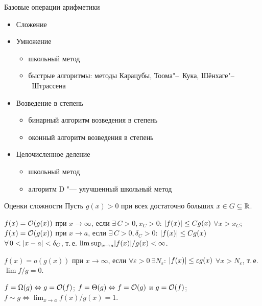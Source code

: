 \documentclass{ca-slides}
\author{}
\begin{document}
\titleframe

\begin{canvasframe}{Базовые операции арифметики}
  \begin{itemize}
    \item Сложение
    \item Умножение
    \begin{itemize}
      \item школьный метод
      \item быстрые алгоритмы: методы Карацубы, Тоома"--~Кука, Шёнхаге"--~Штрассена
    \end{itemize}
    \item Возведение в степень
    \begin{itemize}
      \item бинарный алгоритм возведения в степень
      \item оконный алгоритм возведения в степень
    \end{itemize}
    \item Целочисленное деление
    \begin{itemize}
      \item школьный метод
      \item алгоритм D "--- улучшенный школьный метод
    \end{itemize}
  \end{itemize}
\end{canvasframe}

\begin{canvasframe}[shrink=18]{Оценки сложности}
  \small
  Пусть $g(x) > 0$ при всех достаточно больших $x \in G \subseteq \mathbb{R}$.
  \begin{definition}[$\bigO$]
    $f(x) = \mathcal{O}(g(x))$ при $x \to \infty$, если $\exists\, C > 0, x_C > 0$:
    $\lvert f(x)\rvert \le C g(x)$ $\forall x > x_C$;\\
    $f(x) = \mathcal{O}(g(x))$ при $x \to a$, если $\exists\, C > 0, \delta_C > 0$:
    $\lvert f(x)\rvert \le C g(x)$ $\forall\, 0 < \lvert x - a\rvert < \delta_C$,
    т.\,е. $\limsup_{x \to a} \lvert f(x)\rvert/g(x) < \infty$.
  \end{definition}
  \begin{definition}[$o$]
    $f(x) = o(g(x))$ при $x \to \infty$, если $\forall \varepsilon > 0\ \exists N_\varepsilon$:
    $\lvert f(x)\rvert \le \varepsilon g(x)$ $\forall x > N_\varepsilon$, т.\,е. $\lim f/g = 0$.
  \end{definition}
  \begin{definition}
    $f = \Omega(g) \Leftrightarrow g = \mathcal{O}(f)$;\quad
    $f = \Theta(g) \Leftrightarrow f = \mathcal{O}(g)$ и $g = \mathcal{O}(f)$;\quad
    $f \sim g \Leftrightarrow \lim_{x \to a} f(x)/g(x) = 1$.
  \end{definition}
\end{canvasframe}
\end{document}
